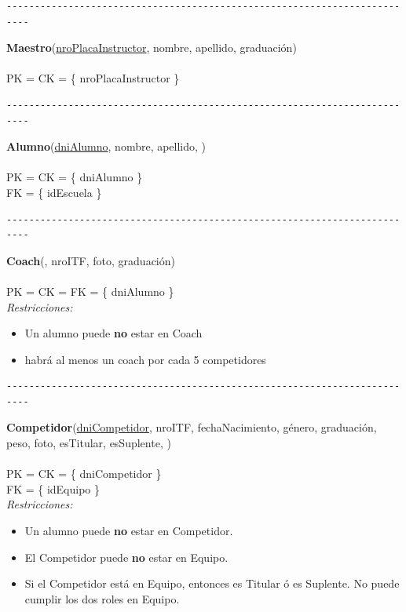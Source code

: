 \begin{verbatim}
--------------------------------------------------------------------------
\end{verbatim}

\noindent\textbf{Maestro}(\uline{nroPlacaInstructor}, nombre, apellido, graduación)
\\
\\
PK = CK = \{ nroPlacaInstructor \} \\


\begin{verbatim}
--------------------------------------------------------------------------
\end{verbatim}

\noindent\textbf{Alumno}(\uline{dniAlumno}, nombre, apellido, )
\\
\\
PK = CK = \{ dniAlumno \} \\
FK = \{ idEscuela \} \\


\begin{verbatim}
--------------------------------------------------------------------------
\end{verbatim}

\noindent\textbf{Coach}(, nroITF, foto, graduación)
\\
\\
PK = CK = FK = \{ dniAlumno \} \\

\textit{Restricciones:}
\begin{itemize}
	\item Un alumno puede \textbf{no} estar en Coach
	\item habrá al menos un coach por cada 5 competidores
\end{itemize}


\begin{verbatim}
--------------------------------------------------------------------------
\end{verbatim}

\noindent\textbf{Competidor}(\uline{dniCompetidor}, nroITF, fechaNacimiento, género, graduación, peso, foto, esTitular, esSuplente, )
\\
\\
PK = CK = \{ dniCompetidor \} \\
FK = \{ idEquipo \} \\


\textit{Restricciones:}
\begin{itemize}
	\item Un alumno puede \textbf{no} estar en Competidor.
	\item El Competidor puede \textbf{no} estar en Equipo.
	\item Si el Competidor está en Equipo, entonces es Titular ó es Suplente. No puede cumplir los dos roles en Equipo.
\end{itemize}


